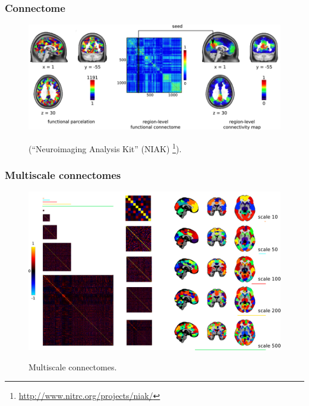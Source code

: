 \documentclass{beamer}
\begin{document}
\begin{frame}
\frametitle{Connectome}
\begin{figure}
\begin{center}
\includegraphics[scale=0.8]{../figures/connectome.png}
\end{center}
\tiny{(``Neuroimaging Analysis Kit'' (NIAK) \footnote{\url{http://www.nitrc.org/projects/niak/}}).}
\label{fig_motion_estimation}
\end{figure}
\end{frame}


\begin{frame}
\frametitle{Multiscale connectomes}
\begin{figure}
\begin{center}
\includegraphics[scale=0.5]{../figures/fig_connectome_multiscale.png}
\end{center}
\tiny{Multiscale connectomes.}
\label{fig_multiscale}
\end{figure}
\end{frame}




\end{document}
